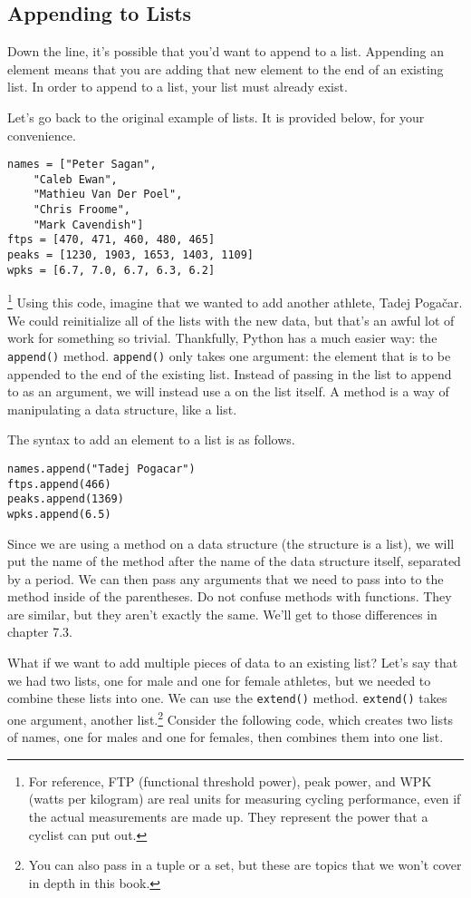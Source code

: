 \subsection{Appending to Lists}
Down the line, it's possible that you'd want to append to a list. Appending an element means that you are adding that new element to the end of an existing list. In order to append to a list, your list must already exist.\par
Let's go back to the original example of lists. It is provided below, for your convenience.
\begin{lstlisting}[style=pippython]
names = ["Peter Sagan",
    "Caleb Ewan",
    "Mathieu Van Der Poel",
    "Chris Froome",
    "Mark Cavendish"]
ftps = [470, 471, 460, 480, 465]
peaks = [1230, 1903, 1653, 1403, 1109]
wpks = [6.7, 7.0, 6.7, 6.3, 6.2]
\end{lstlisting}\footnote{For reference, FTP (functional threshold power), peak power, and WPK (watts per kilogram) are real units for measuring cycling performance, even if the actual measurements are made up. They represent the power that a cyclist can put out.}
Using this code, imagine that we wanted to add another athlete, Tadej Poga\v{c}ar. We could reinitialize all of the lists with the new data, but that's an awful lot of work for something so trivial. Thankfully, Python has a much easier way: the \verb|append()| method. \verb|append()| only takes one argument: the element that is to be appended to the end of the existing list. Instead of passing in the list to append to as an argument, we will instead use a  on the list itself. A method is a way of manipulating a data structure, like a list.\par
The syntax to add an element to a list is as follows.\par
\begin{lstlisting}[style=pippython]
names.append("Tadej Pogacar")
ftps.append(466)
peaks.append(1369)
wpks.append(6.5)
\end{lstlisting}
Since we are using a method on a data structure (the structure is a list), we will put the name of the method after the name of the data structure itself, separated by a period. We can then pass any arguments that we need to pass into to the method inside of the parentheses. Do not confuse methods with functions. They are similar, but they aren't exactly the same. We'll get to those differences in chapter 7.3.\par
What if we want to add multiple pieces of data to an existing list? Let's say that we had two lists, one for male and one for female athletes, but we needed to combine these lists into one. We can use the \verb|extend()| method. \verb|extend()| takes one argument, another list.\footnote{You can also pass in a tuple or a set, but these are topics that we won't cover in depth in this book.} Consider the following code, which creates two lists of names, one for males and one for females, then combines them into one list.
